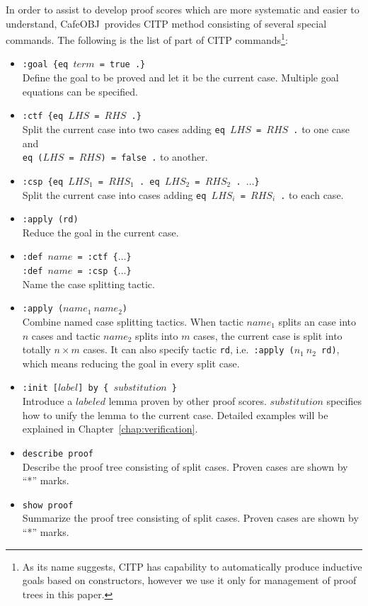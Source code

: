 \documentclass[12pt]{report}
\newcommand{\stt}[1]{{\small{\tt {#1}}}}
\newcommand{\cafeobj}{{\sf CafeOBJ}~}
\begin{document}
In order to assist to develop proof scores which are more systematic
and easier to understand, \cafeobj provides CITP method consisting of
several special commands. The following is the list of part of CITP
commands\footnote{As its name suggests, CITP has capability to
  automatically produce inductive goals based on constructors, however
  we use it only for management of proof trees in this paper.}:
\begin{itemize}
\item \stt{:goal \{eq $term$ = true .\}}\\ Define the goal to be
  proved and let it be the current case. Multiple goal equations
  can be specified.
\item \stt{:ctf \{eq $LHS$ = $RHS$ .\}}\\
  Split the current case into two cases adding \stt{eq~$LHS$~=~$RHS$~.} to one case and\\
  \stt{eq~($LHS$~=~$RHS$)~=~false~.} to another.
\item \stt{:csp \{eq $LHS\!_1$ = $RHS\!_1$ . eq $LHS\!_2$ = $RHS\!_2$ . $\dots$\}}\\
  Split the current case into cases adding 
  \stt{eq~$LHS\!_i$~=~$RHS\!_i$~.} to each case.
\item \stt{:apply (rd)}\\
 Reduce the goal in the current case.
\item \stt{:def $name$ = :ctf \{$\dots$\}}\\
  \stt{:def $name$ = :csp \{$\dots$\}}\\
  Name the case splitting tactic.
\item \stt{:apply ($name_1\ name_2$)}\\ 
  Combine named case splitting tactics. When tactic $name_1$ splits an case into
  $n$ cases and tactic $name_2$ splits into $m$ cases, the current case is
  split into totally $n\times m$ cases.  It can also specify tactic
  {\tt rd}, i.e.\ \stt{:apply~($n_1\ n_2$~rd)}, which means reducing
  the goal in every split case.
\item \stt{:init [$label$] by \{ $substitution$ \}}\\
  Introduce a $labeled$ lemma proven by other proof scores. $substitution$ specifies
  how to unify the lemma to the current case. Detailed examples will be explained
  in Chapter~\ref{chap:verification}.
\item \stt{describe proof}\\
 Describe the proof tree consisting of split cases. Proven cases are shown by ``*'' marks.
\item \stt{show proof}\\
Summarize the proof tree consisting of split cases. Proven cases are shown by ``*'' marks.
\end{itemize}
\end{document}
